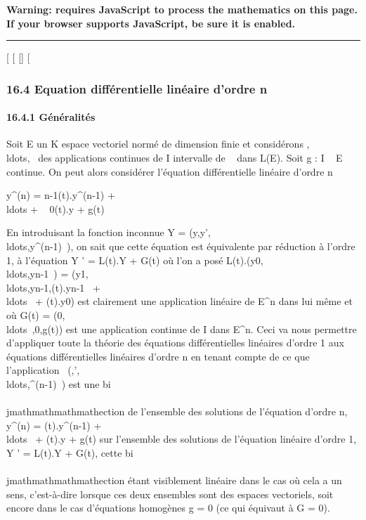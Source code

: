 \textbf{Warning: 
requires JavaScript to process the mathematics on this page.\\ If your
browser supports JavaScript, be sure it is enabled.}

\begin{center}\rule{3in}{0.4pt}\end{center}

{[}
{[}
{[}{]}
{[}

\subsubsection{16.4 Equation différentielle linéaire d'ordre n}

\paragraph{16.4.1 Généralités}

Soit E un K espace vectoriel normé de dimension finie et considérons
,\\ldots,~
des applications continues de I intervalle de ~ dans L(E). Soit g : I \rightarrow~
E continue. On peut alors considérer l'équation différentielle linéaire
d'ordre n

y^(n) = \ell n-1(t).y^(n-1) +
\\ldots + \ell~
0(t).y + g(t)

En introduisant la fonction inconnue Y =
(y,y',\\ldots,y^(n-1)~),
on sait que cette équation est équivalente par réduction à l'ordre 1, à
l'équation Y ' = L(t).Y + G(t) où l'on a posé
L(t).(y0,\\ldots,yn-1~)
=
(y1,\\ldots,yn-1,(t).yn-1~
+ \\ldots~ +
(t).y0) est clairement une application linéaire de
E^n dans lui même et où G(t) =
(0,\\ldots~,0,g(t))
est une application continue de I dans E^n. Ceci va nous
permettre d'appliquer toute la théorie des équations différentielles
linéaires d'ordre 1 aux équations différentielles linéaires d'ordre n en
tenant compte de ce que l'application
\phi\mapsto~(\phi,\phi',\\ldots,\phi^(n-1)~)
est une bi\\\\jmathmathmathmathection de l'ensemble des solutions de l'équation d'ordre n,
y^(n) = (t).y^(n-1) +
\\ldots~ +
(t).y + g(t) sur l'ensemble des solutions de l'équation
linéaire d'ordre 1, Y ' = L(t).Y + G(t), cette bi\\\\jmathmathmathmathection étant
visiblement linéaire dans le cas où cela a un sens, c'est-à-dire lorsque
ces deux ensembles sont des espaces vectoriels, soit encore dans le cas
d'équations homogènes g = 0 (ce qui équivaut à G = 0).

